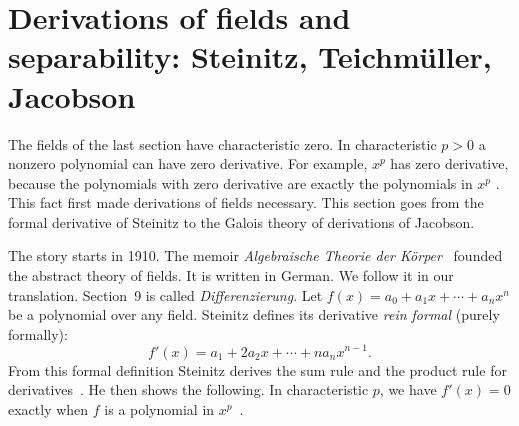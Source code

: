 \section[Derivations of fields and separability: Steinitz, Teichm\"uller, Jacobson][Fields and separability]{Derivations of fields and separability: Steinitz, Teichm\"uller, Jacobson}\label{sec:origins:fields-and-separability}

The fields of the last section have characteristic zero. In characteristic $p > 0$ a nonzero polynomial can have zero derivative. For
example, $x^p$ has zero derivative, because the polynomials with zero
derivative are exactly the polynomials in $x^p$
\cite[\S 9, p.~213]{Steinitz1910}. This fact first made
derivations of fields necessary. This section goes from the formal derivative
of Steinitz to the Galois theory of derivations of Jacobson.

The story starts in 1910. The memoir \emph{Algebraische Theorie der K\"orper}~\cite{Steinitz1910}
founded the abstract theory of fields. It is written in German. We follow it
in our translation. Section~9 is called \emph{Differenzierung}. Let
$f(x) = a_0 + a_1x + \cdots + a_nx^n$ be a polynomial over any field.
Steinitz defines its derivative \emph{rein formal} (purely formally):
\[
  f'(x) = a_1 + 2a_2x + \cdots + na_nx^{n-1}.
\]
From this formal definition Steinitz derives the sum rule and the product
rule for derivatives~\cite[\S 9, pp.~209--210]{Steinitz1910}. He then shows the following.
In characteristic $p$, we have $f'(x) = 0$ exactly when $f$ is a polynomial
in $x^p$~\cite[\S 9, p.~213]{Steinitz1910}.

